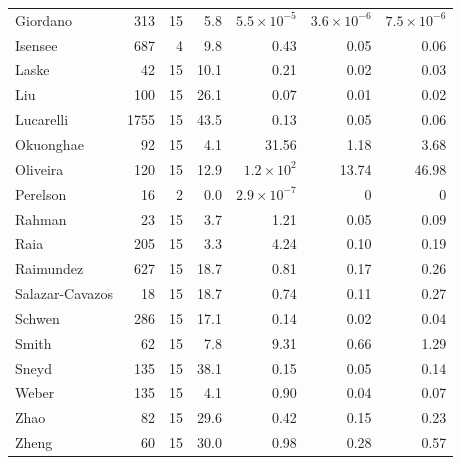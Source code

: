 \begin{longtable}{@{}lrrrrrr@{}}
Giordano & 313 & 15 & 5.8 & $5.5\times10^{-5}$ & $3.6\times10^{-6}$ & $7.5\times10^{-6}$ \\
Isensee & 687 & 4 & 9.8 & 0.43 & 0.05 & 0.06 \\
Laske & 42 & 15 & 10.1 & 0.21 & 0.02 & 0.03 \\
Liu & 100 & 15 & 26.1 & 0.07 & 0.01 & 0.02 \\
Lucarelli & 1755 & 15 & 43.5 & 0.13 & 0.05 & 0.06 \\
Okuonghae & 92 & 15 & 4.1 & 31.56 & 1.18 & 3.68 \\
Oliveira & 120 & 15 & 12.9 & $1.2\times10^{2}$ & 13.74 & 46.98 \\
Perelson & 16 & 2 & 0.0 & $2.9\times10^{-7}$ & 0 & 0 \\
Rahman & 23 & 15 & 3.7 & 1.21 & 0.05 & 0.09 \\
Raia & 205 & 15 & 3.3 & 4.24 & 0.10 & 0.19 \\
Raimundez & 627 & 15 & 18.7 & 0.81 & 0.17 & 0.26 \\
Salazar-Cavazos & 18 & 15 & 18.7 & 0.74 & 0.11 & 0.27 \\
Schwen & 286 & 15 & 17.1 & 0.14 & 0.02 & 0.04 \\
Smith & 62 & 15 & 7.8 & 9.31 & 0.66 & 1.29 \\
Sneyd & 135 & 15 & 38.1 & 0.15 & 0.05 & 0.14 \\
Weber & 135 & 15 & 4.1 & 0.90 & 0.04 & 0.07 \\
Zhao & 82 & 15 & 29.6 & 0.42 & 0.15 & 0.23 \\
Zheng & 60 & 15 & 30.0 & 0.98 & 0.28 & 0.57 \\
\bottomrule
\end{longtable}
